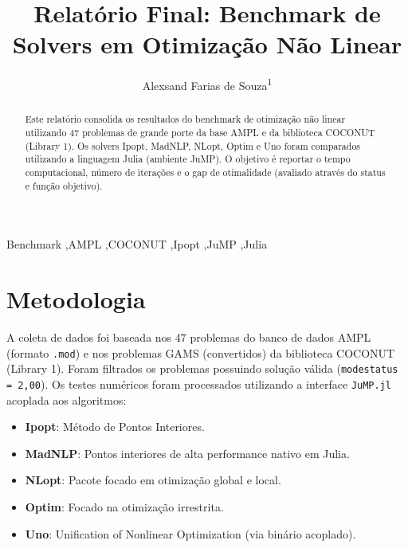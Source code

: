 \documentclass[preprint,12pt]{elsarticle}
\begin{document}
\begin{frontmatter}

\title{Relat\'orio Final: Benchmark de Solvers em Otimiza\c{c}\~ao N\~ao Linear}

\author{Alexsand Farias de Souza\textsuperscript{1}}

\address{\textsuperscript{1}Mestrando em Engenharia Elétrica - PPGEE-UFAM, 
Disciplina de Otimização - Prof. Dr. Kenny Vinente dos Santos, 
Manaus, AM, Brasil}

\begin{abstract}
Este relat\'orio consolida os resultados do benchmark de otimiza\c{c}\~ao n\~ao linear utilizando 47 problemas de grande porte da base AMPL e da biblioteca COCONUT (Library 1). Os solvers Ipopt, MadNLP, NLopt, Optim e Uno foram comparados utilizando a linguagem Julia (ambiente JuMP). O objetivo \'e reportar o tempo computacional, n\'umero de itera\c{c}\~oes e o gap de otimalidade (avaliado atrav\'es do status e fun\c{c}\~ao objetivo).
\end{abstract}

\begin{keyword}
Benchmark \sep AMPL \sep COCONUT \sep Ipopt \sep JuMP \sep Julia
\end{keyword}

\end{frontmatter}

\section{Metodologia}
A coleta de dados foi baseada nos 47 problemas do banco de dados AMPL (formato \texttt{.mod}) e nos problemas GAMS (convertidos) da biblioteca COCONUT (Library 1). Foram filtrados os problemas possuindo solu\c{c}\~ao v\'alida (\texttt{modestatus = 2,00}).
Os testes num\'ericos foram processados utilizando a interface \texttt{JuMP.jl} acoplada aos algoritmos:
\begin{itemize}
    \item \textbf{Ipopt}: M\'etodo de Pontos Interiores.
    \item \textbf{MadNLP}: Pontos interiores de alta performance nativo em Julia.
    \item \textbf{NLopt}: Pacote focado em otimiza\c{c}\~ao global e local.
    \item \textbf{Optim}: Focado na otimiza\c{c}\~ao irrestrita.
    \item \textbf{Uno}: Unification of Nonlinear Optimization (via bin\'ario acoplado).
\end{itemize}
\end{document}

